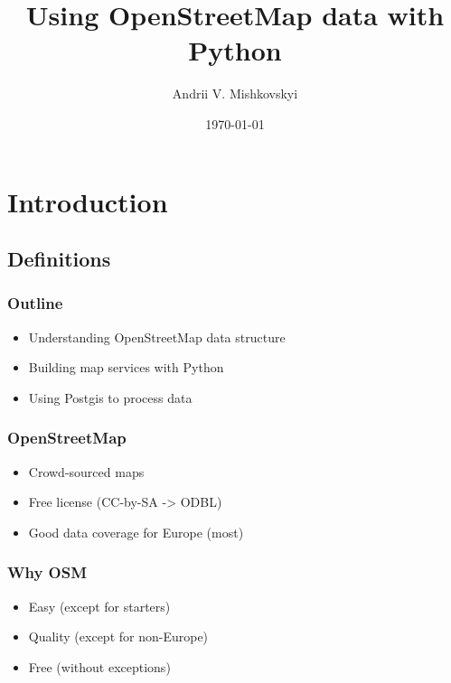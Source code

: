 \documentclass[14pt]{beamer}
\title{Using OpenStreetMap data with Python}
\author{Andrii V. Mishkovskyi}
\date{\today}
\begin{document}
%     

\begin{frame}
  \titlepage
\end{frame}

\begin{frame}
  \tableofcontents
\end{frame}

\section{Introduction}

\subsection{Definitions}
\label{sec:definitions}

\begin{frame}
  \frametitle{Outline}
  \begin{itemize}
  \item Understanding OpenStreetMap data structure
  \item Building map services with Python
  \item Using Postgis to process data
  \end{itemize}
\end{frame}

\begin{frame}
  \frametitle{OpenStreetMap}
  \begin{itemize}
  \item Crowd-sourced maps
  \item Free license (CC-by-SA -> ODBL)
  \item Good data coverage for Europe (most)
  \end{itemize}
\end{frame}

\begin{frame}
  \frametitle{Why OSM}
  \begin{itemize}
  \item Easy (except for starters)
  \item Quality (except for non-Europe)
  \item Free (without exceptions)
  \end{itemize}
\end{frame}
\end{document}
